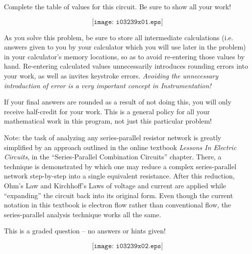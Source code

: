 

Complete the table of values for this circuit.  Be sure to show all your work!

$$\texttt{[image: i03239x01.eps]}$$

As you solve this problem, be sure to store all intermediate calculations (i.e. answers given to you by your calculator which you will use later in the problem) in your calculator's memory locations, so as to avoid re-entering those values by hand.  Re-entering calculated values unnecessarily introduces rounding errors into your work, as well as invites keystroke errors.  {\it Avoiding the unnecessary introduction of error is a very important concept in Instrumentation!}

If your final answers are rounded as a result of not doing this, you will only receive half-credit for your work.  This is a general policy for all your mathematical work in this program, not just this particular problem!


\vfil 

Note: the task of analyzing any series-parallel resistor network is greatly simplified by an approach outlined in the online textbook {\it Lessons In Electric Circuits}, in the ``Series-Parallel Combination Circuits'' chapter.  There, a technique is demonstrated by which one may reduce a complex series-parallel network step-by-step into a single equivalent resistance.  After this reduction, Ohm's Law and Kirchhoff's Laws of voltage and current are applied while ``expanding'' the circuit back into its original form.  Even though the current notation in this textbook is electron flow rather than conventional flow, the series-parallel analysis technique works all the same.

\eject






This is a graded question -- no answers or hints given!







$$\texttt{[image: i03239x02.eps]}$$



